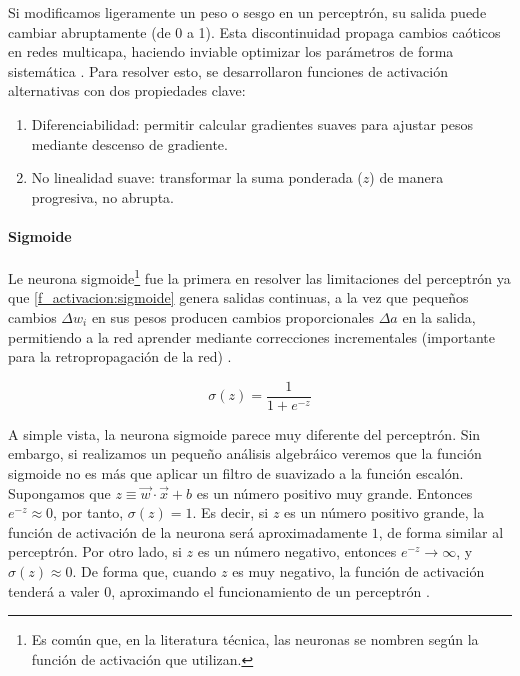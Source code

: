 Si modificamos ligeramente un peso o sesgo en un perceptrón, su salida puede cambiar abruptamente (de 0 a 1). Esta discontinuidad propaga cambios caóticos en redes multicapa, haciendo inviable optimizar los parámetros de forma sistemática \cite{nn_dl__michael_nielsen_2015}. Para resolver esto, se desarrollaron funciones de activación alternativas con dos propiedades clave:

\begin{enumerate}
    \item Diferenciabilidad: permitir calcular gradientes suaves para ajustar pesos mediante descenso de gradiente.
    \item No linealidad suave: transformar la suma ponderada ($z$) de manera progresiva, no abrupta.
\end{enumerate}

\paragraph{Sigmoide}

Le neurona sigmoide\footnote{Es común que, en la literatura técnica, las neuronas se nombren según la función de activación que utilizan.} fue la primera en resolver las limitaciones del perceptrón ya que \ref{f_activacion:sigmoide} genera salidas continuas, a la vez que pequeños cambios $\Delta w_i$ en sus pesos producen cambios proporcionales $\Delta a$ en la salida, permitiendo a la red aprender mediante correcciones incrementales (importante para la retropropagación de la red) \cite{nn_dl__michael_nielsen_2015}.

\begin{equation}\label{f_activacion:sigmoide}
    \sigma(z) = \frac{1}{1 + e^{-z}}
\end{equation}

A simple vista, la neurona sigmoide parece muy diferente del perceptrón. Sin embargo, si realizamos un pequeño análisis algebráico veremos que la función sigmoide no es más que aplicar un filtro de suavizado a la función escalón. Supongamos que $z \equiv \vec{w}\cdot\vec{x} + b$ es un número positivo muy grande. Entonces $e^{-z} \approx 0$, por tanto, $\sigma(z) = 1$. Es decir, si $z$ es un número positivo grande, la función de activación de la neurona será aproximadamente $1$, de forma similar al perceptrón. Por otro lado, si $z$ es un número negativo, entonces $e^{-z} \rightarrow \infty$, y $\sigma(z) \approx 0$. De forma que, cuando $z$ es muy negativo, la función de activación tenderá a valer $0$, aproximando el funcionamiento de un perceptrón \cite{nn_dl__michael_nielsen_2015}.


